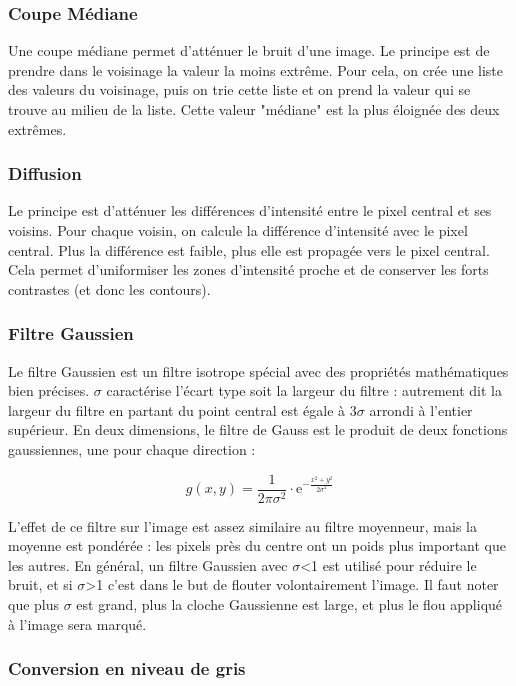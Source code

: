 \subsubsection*{Coupe Médiane}

Une coupe médiane permet d’atténuer le bruit d’une image. Le principe est de prendre dans le voisinage la valeur la moins extrême. Pour cela, on crée une liste des valeurs du voisinage, puis on trie cette liste et on prend la valeur qui se trouve au milieu de la liste. Cette valeur "médiane" est la plus éloignée des deux extrêmes.

\subsubsection*{Diffusion}

Le principe est d’atténuer les différences d'intensité entre le pixel central et ses voisins. Pour chaque voisin, on calcule la différence d'intensité avec le pixel central. Plus la différence est faible, plus elle est propagée vers le pixel central. Cela permet d'uniformiser les zones d'intensité proche et de conserver les forts contrastes (et donc les contours).

\subsubsection*{Filtre Gaussien}
\label{FiltreGaussien}

Le filtre Gaussien est un filtre isotrope spécial avec des propriétés mathématiques bien précises. $\sigma$ caractérise l'écart type soit la largeur du filtre : autrement dit la largeur du filtre en partant du point central est égale à 3$\sigma$ arrondi à l'entier supérieur. En deux dimensions, le filtre de Gauss est le produit de deux fonctions gaussiennes, une pour chaque direction :

$$g(x,y) = \frac{1}{2\pi\sigma^2}\cdot \mathrm{e}^{-\frac{x^2+y^2}{2\sigma^2}}$$

L’effet de ce filtre sur l’image est assez similaire au filtre moyenneur, mais la moyenne est pondérée : les pixels près du centre ont un poids plus important que les autres. En général, un filtre Gaussien avec $\sigma$<1 est utilisé pour réduire le bruit, et si $\sigma$>1 c’est dans le but de flouter volontairement l'image. Il faut noter que plus $\sigma$ est grand, plus la cloche Gaussienne est large, et plus le flou appliqué à l’image sera marqué.

\subsubsection{Conversion en niveau de gris}

